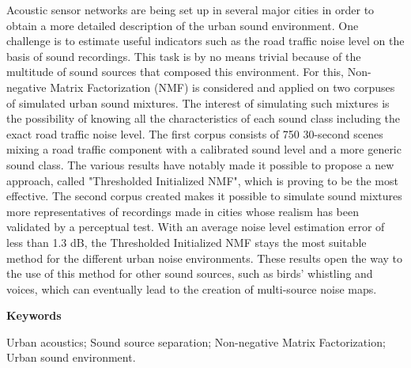 \begin{cover}
\begin{multicols}{2}
	{\small \begin{spacing}{1.0}Acoustic sensor networks are being set up in several major cities in order to obtain a more detailed description of the urban sound environment. One challenge is to estimate useful indicators such as the road traffic noise level on the basis of sound recordings. This task is by no means trivial because of the multitude of sound sources that composed this environment. For this, Non-negative Matrix Factorization (NMF) is considered and applied on two corpuses of simulated urban sound mixtures. The interest of simulating such mixtures is the possibility of knowing all the characteristics of each sound class including the exact road traffic noise level. 
The first corpus consists of 750 30-second scenes mixing a road traffic component with a calibrated sound level and a more generic sound class. The various results have notably made it possible to propose a new approach, called "Thresholded Initialized NMF", which is proving to be the most effective. The second corpus created makes it possible to simulate sound mixtures more representatives of recordings made in cities whose realism has been validated by a perceptual test. With an average noise level estimation error of less than 1.3 dB, the Thresholded Initialized NMF stays the most suitable method for the different urban noise environments.  
These results open the way to the use of this method for other sound sources, such as birds' whistling and voices, which can eventually lead to the creation of multi-source noise maps.\end{spacing}}
    
    
    \noindent 
    \bigskip

    \noindent
    \textbf{Keywords}
    \smallskip
    
\begin{spacing}{1.2}
\noindent 
Urban acoustics; Sound source separation; Non-negative Matrix Factorization; Urban sound environment.
\end{spacing}
  \end{multicols}
\end{cover}
